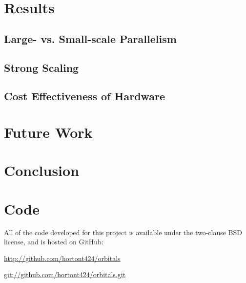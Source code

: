\documentclass{acmsiggraph}
\begin{document}
\section{Results}

\subsection{Large- vs. Small-scale Parallelism}

\subsection{Strong Scaling}

\subsection{Cost Effectiveness of Hardware}

\section{Future Work}

\section{Conclusion}

\section{Code}

All of the code developed for this project is available under the two-clause BSD license, and is hosted on GitHub:

\url{http://github.com/hortont424/orbitals}

\url{git://github.com/hortont424/orbitals.git}


\nocite{*}

\end{document}
